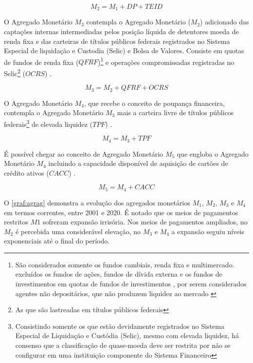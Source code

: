 \documentclass[
  12pt,
  12pt,
  openright,
  oneside,
  a4paper,
  chapter=TITLE,
  section=TITLE,
  subsection=TITLE,
  subsubsection=TITLE,
  english,
  portugues,
  sumario=tradicional]{abntex2}
\begin{document}
\begin{equation}
M_2 = M_1 + DP + TEID
\end{equation}

O Agregado Monetário \(M_3\) contempla o Agregado Monetário (\(M_2\)) adicionado das captações internas intermediadas pelos posição líquida de detentores moeda de renda fixa e das carteiras de títulos públicos federais registrados no Sistema Especial de liquidação e Custodia (Selic) e Bolsa de Valores. Consiste em quotas de fundos de renda fixa (\(QFRF\))\footnote{São considerados somente os fundos cambiais, renda fixa  e multimercado. excluídos os fundos de ações, fundos de dívida externa e os fundos de investimentos em quotas de fundos de investimentos , por serem considerados agentes não depositários, que não produzem liquidez ao mercado \cite{sgs:mpa}} e operações compromissadas registradas no Selic\footnote{As que são lastreadas em títulos públicos federais} (\(OCRS\)) \cite{bcb:2019} \cite{sgs:mpa}.

\begin{equation}
M_3 = M_2 + QFRF + OCRS
\end{equation}

O Agregado Monetário \(M_4\), que recebe o conceito de poupança financeira, contempla o Agregado Monetário \(M_3\) mais a carteira livre de títulos públicos federais\footnote{Consistindo somente os que estão devidamente registrados no Sistema Especial de Liquidação e Custódia (Selic), mesmo com elevada liquidez, há consenso que a classificação de quase-moeda deve ser restrita por não se configurar em uma instituição componente do Sistema Financeiro} de elevada liquidez (\(TPF\)) \cite{bcb:2019}.

\begin{equation}
M_4 = M_3 + TPF
\end{equation}

É possível chegar ao conceito de Agregado Monetário \(M_5\) que engloba o Agregado Monetário \(M_4\) incluindo a capacidade disponível de aquisição de cartões de crédito ativos (\(CACC\)) \cite{cordoba:1996}.

\begin{equation}
M_5 = M_4 + CACC
\end{equation}

O \autoref{graf:agrag} demonstra a evolução dos agregados monetários \(M_1\), \(M_2\), \(M_3\) e \(M_4\) em termos correntes, entre 2001 e 2020. É notado que os meios de pagamentos restritos \(M1\) sofreram expansão irrisória. Nos meios de pagamentos ampliados, no \(M_2\) é percebida uma considerável elevação, no \(M_3\) e \(M_4\) a expansão seguiu níveis exponenciais até o final do período.
\end{document}
